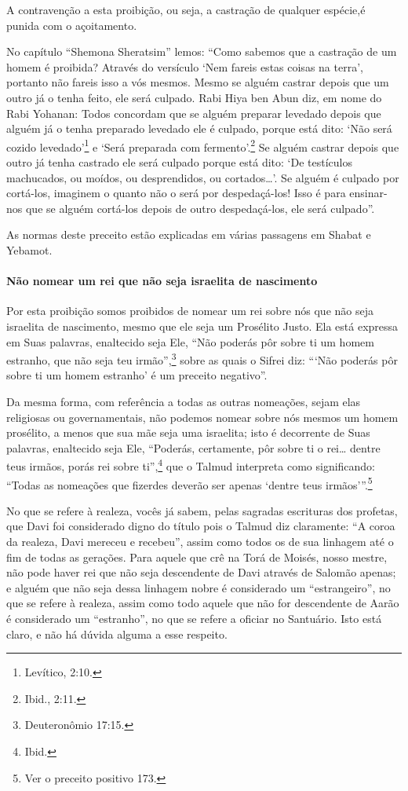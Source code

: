 A contravenção a esta proibição, ou seja, a castração de qualquer
espécie,é punida com o açoitamento.

No capítulo ``Shemona Sheratsim'' lemos: ``Como sabemos que a castração
de um homem é proibida? Através do versículo `Nem fareis estas coisas na
terra', portanto não fareis isso a vós mesmos. Mesmo se alguém castrar
depois que um outro já o tenha feito, ele será culpado. Rabi Hiya ben
Abun diz, em nome do Rabi Yohanan: Todos concordam que se alguém
preparar levedado depois que alguém já o tenha preparado levedado ele é
culpado, porque está dito: `Não será cozido levedado'\footnote{Levítico, 2:10.} e
`Será preparada com fermento'.\footnote{Ibid., 2:11.} Se alguém castrar depois
que outro já tenha castrado ele será culpado porque está dito: `De
testículos machucados, ou moídos, ou desprendidos, ou cortados\ldots{}'. Se
alguém é culpado por cortá-los, imaginem o quanto não o será por
despedaçá-los! Isso é para ensinar-nos que se alguém cortá-los depois de
outro despedaçá-los, ele será culpado''.

As normas deste preceito estão explicadas em várias passagens em Shabat
e Yebamot.

\paragraph{Não nomear um rei que não seja israelita de nascimento}

Por esta proibição somos proibidos de nomear um rei sobre nós que não
seja israelita de nascimento, mesmo que ele seja um Prosélito Justo. Ela
está expressa em Suas palavras, enaltecido seja Ele, ``Não poderás pôr
sobre ti um homem estranho, que não seja teu irmão'',\footnote{Deuteronômio
17:15.} sobre as quais o Sifrei diz: ```Não poderás pôr sobre ti um homem estranho' é
um preceito negativo''.

Da mesma forma, com referência a todas as outras nomeações, sejam elas
religiosas ou governamentais, não podemos nomear sobre nós mesmos um
homem prosélito, a menos que sua mãe seja uma israelita; isto é
decorrente de Suas palavras, enaltecido seja Ele, ``Poderás,
certamente, pôr sobre ti o rei\ldots{} dentre teus irmãos, porás rei sobre
ti'',\footnote{Ibid.} que o Talmud interpreta como significando: ``Todas as
nomeações que fizerdes deverão ser apenas `dentre teus
irmãos'''.\footnote{Ver o preceito positivo 173.}

No que se refere à realeza, vocês já sabem, pelas sagradas escrituras
dos profetas, que Davi foi considerado digno do título pois o Talmud diz
claramente: ``A coroa da realeza, Davi mereceu e recebeu'', assim como
todos os de sua linhagem até o fim de todas as gerações. Para aquele que
crê na Torá de Moisés, nosso mestre, não pode haver rei que não seja
descendente de Davi através de Salomão apenas; e alguém que não seja
dessa linhagem nobre é considerado um ``estrangeiro'', no que se refere
à realeza, assim como todo aquele que não for descendente de Aarão é
considerado um ``estranho'', no que se refere a oficiar no Santuário.
Isto está claro, e não há dúvida alguma a esse respeito.

